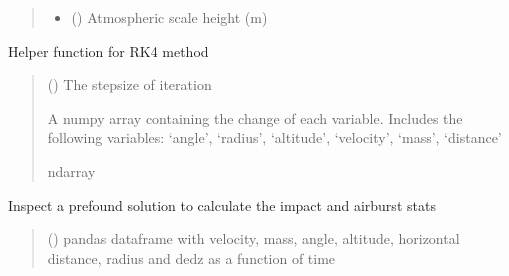 \documentclass[letterpaper,10pt,english]{sphinxmanual}
\begin{document}
\begin{fulllineitems}
\begin{quote}
\begin{description}
\begin{itemize}
\item {} 
\sphinxAtStartPar
{} (\sphinxstyleliteralemphasis{\sphinxupquote{, }}) \textendash{} Atmospheric scale height (m)

\end{itemize}

\end{description}\end{quote}

\begin{fulllineitems}
\label{\detokenize{index:solver.Planet.RK4_helper}}
\pysigstartsignatures
{}
\pysigstopsignatures
\sphinxAtStartPar
Helper function for RK4 method
\begin{quote}\begin{description}
\sphinxAtStartPar
{} () \textendash{} The stepsize of iteration

\sphinxAtStartPar
{} \textendash{} A numpy array containing the change of each variable.
Includes the following variables:
‘angle’, ‘radius’, ‘altitude’,
‘velocity’, ‘mass’, ‘distance’

\sphinxAtStartPar
ndarray

\end{description}\end{quote}

\end{fulllineitems}


\begin{fulllineitems}
\label{\detokenize{index:solver.Planet.analyse_outcome}}
\pysigstartsignatures
{}
\pysigstopsignatures
\sphinxAtStartPar
Inspect a pre\sphinxhyphen{}found solution to calculate the impact and airburst stats
\begin{quote}\begin{description}
\sphinxAtStartPar
{} () \textendash{} pandas dataframe with velocity, mass, angle, altitude, horizontal
distance, radius and dedz as a function of time


\end{description}
\end{quote}
\end{fulllineitems}
\end{fulllineitems}
\end{document}
